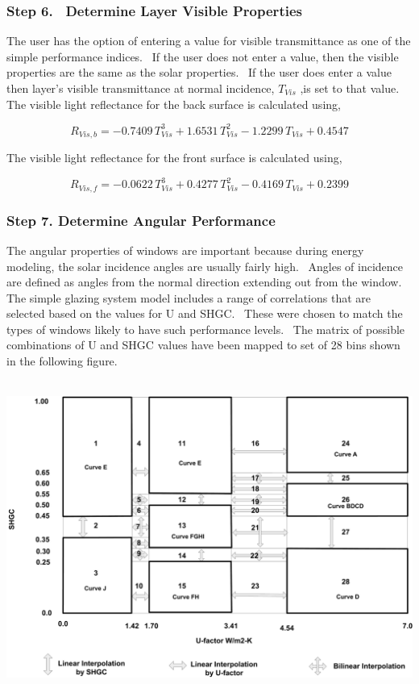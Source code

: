 \subsubsection{Step 6.~ Determine Layer Visible Properties}\label{step-6.-determine-layer-visible-properties}

The user has the option of entering a value for visible transmittance as one of the simple performance indices.~ If the user does not enter a value, then the visible properties are the same as the solar properties.~ If the user does enter a value then layer's visible transmittance at normal incidence, \({T_{Vis}}\) ,is set to that value.~ The visible light reflectance for the back surface is calculated using,

\begin{equation}
{R_{Vis,b}} =  - 0.7409\,T_{Vis}^3 + 1.6531\,T_{Vis}^2 - 1.2299\,{T_{Vis}} + 0.4547
\end{equation}

The visible light reflectance for the front surface is calculated using,

\begin{equation}
{R_{Vis,f}} =  - 0.0622\,T_{Vis}^3 + 0.4277\,T_{Vis}^2 - 0.4169\,{T_{Vis}} + 0.2399
\end{equation}

\subsubsection{Step 7. Determine Angular Performance}\label{step-7.-determine-angular-performance}

The angular properties of windows are important because during energy modeling, the solar incidence angles are usually fairly high.~ Angles of incidence are defined as angles from the normal direction extending out from the window.~ The simple glazing system model includes a range of correlations that are selected based on the values for U and SHGC.~ These were chosen to match the types of windows likely to have such performance levels.~ The matrix of possible combinations of U and SHGC values have been mapped to set of 28 bins shown in the following figure.

~\includegraphics{media/image947.png}


